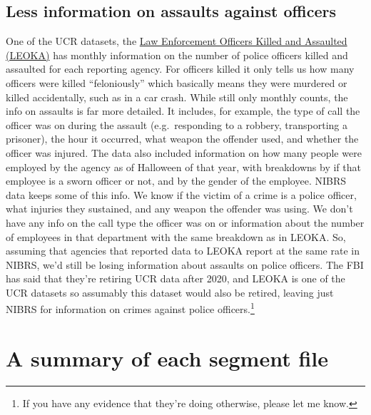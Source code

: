 \documentclass[
  12pt,
  openany]{book}
\begin{document}
\hypertarget{less-information-on-assaults-against-officers}{%
\subsection{Less information on assaults against officers}\label{less-information-on-assaults-against-officers}}

One of the UCR datasets, the \href{https://ucrbook.com/leoka.html}{Law Enforcement Officers Killed and Assaulted (LEOKA)} has monthly information on the number of police officers killed and assaulted for each reporting agency. For officers killed it only tells us how many officers were killed ``feloniously'' which basically means they were murdered or killed accidentally, such as in a car crash. While still only monthly counts, the info on assaults is far more detailed. It includes, for example, the type of call the officer was on during the assault (e.g.~responding to a robbery, transporting a prisoner), the hour it occurred, what weapon the offender used, and whether the officer was injured. The data also included information on how many people were employed by the agency as of Halloween of that year, with breakdowns by if that employee is a sworn officer or not, and by the gender of the employee. NIBRS data keeps some of this info. We know if the victim of a crime is a police officer, what injuries they sustained, and any weapon the offender was using. We don't have any info on the call type the officer was on or information about the number of employees in that department with the same breakdown as in LEOKA. So, assuming that agencies that reported data to LEOKA report at the same rate in NIBRS, we'd still be losing information about assaults on police officers. The FBI has said that they're retiring UCR data after 2020, and LEOKA is one of the UCR datasets so assumably this dataset would also be retired, leaving just NIBRS for information on crimes against police officers.\footnote{If you have any evidence that they're doing otherwise, please let me know.}

\hypertarget{a-summary-of-each-segment-file}{%
\section{A summary of each segment file}\label{a-summary-of-each-segment-file}}
\end{document}
